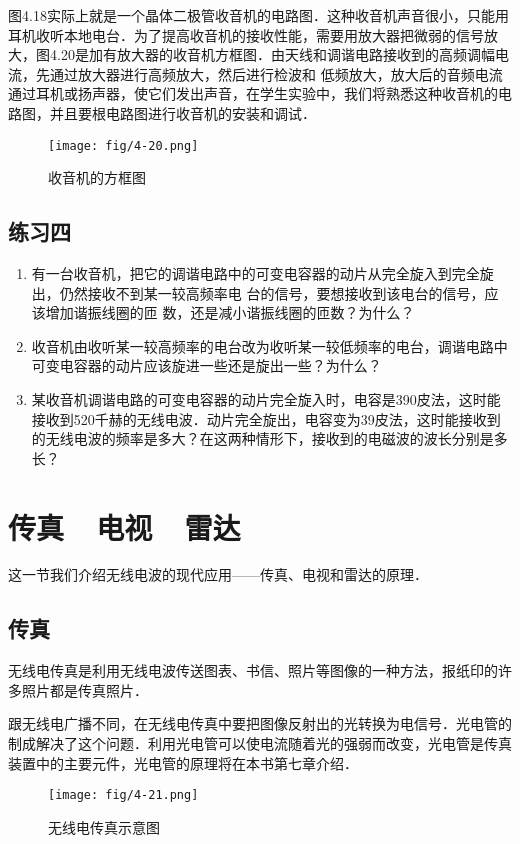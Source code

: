 图4.18实际上就是一个晶体二极管收音机的电路图．这种收音机声音很小，只能用耳机收听本地电台．为了提高收音机的接收性能，需要用放大器把微弱的信号放大，图4.20是加有放大器的收音机方框图．由天线和调谐电路接收到的高频调幅电流，先通过放大器进行高频放大，然后进行检波和
低频放大，放大后的音频电流通过耳机或扬声器，使它们发出声音，在学生实验中，我们将熟悉这种收音机的电路图，并且要根电路图进行收音机的安装和调试．
\begin{figure}[htp]\centering
\texttt{[image: fig/4-20.png]}
\caption{收音机的方框图}
\end{figure}


\subsection*{练习四}
\begin{enumerate}
	\item 有一台收音机，把它的调谐电路中的可变电容器的动片从完全旋入到完全旋出，仍然接收不到某一较高频率电
	台的信号，要想接收到该电台的信号，应该增加谐振线圈的匝
	数，还是减小谐振线圈的匝数？为什么？
	\item 收音机由收听某一较高频率的电台改为收听某一较低频率的电台，调谐电路中可变电容器的动片应该旋进一些还是旋出一些？为什么？
	\item 某收音机调谐电路的可变电容器的动片完全旋入时，电容是390皮法，这时能接收到520千赫的无线电波．动片完全旋出，电容变为39皮法，这时能接收到的无线电波的频率是多大？在这两种情形下，接收到的电磁波的波长分别是多长？
\end{enumerate}

\section{传真~~电视~~雷达}
这一节我们介绍无线电波的现代应用——传真、电视和雷达的原理．

\subsection{传真}

无线电传真是利用无线电波传送图表、书信、照片等图像的一种方法，报纸印的许多照片都是传真照片．

跟无线电广播不同，在无线电传真中要把图像反射出的光转换为电信号．光电管的制成解决了这个问题．利用光电管可以使电流随着光的强弱而改变，光电管是传真装置中的主要元件，光电管的原理将在本书第七章介绍．
\begin{figure}[htp]\centering
	\texttt{[image: fig/4-21.png]}
	\caption{无线电传真示意图}
	\end{figure}

